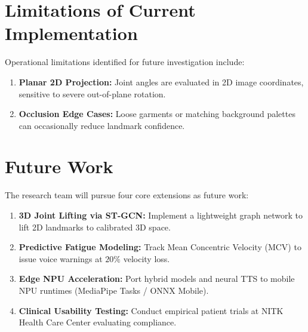 \documentclass[12pt]{report}
\begin{document}
\section{Limitations of Current Implementation}
Operational limitations identified for future investigation include:
\begin{enumerate}[label={(\alph*)}, leftmargin=*, itemsep=0pt, topsep=0.1em, parsep=0pt]
    \item \textbf{Planar 2D Projection:} Joint angles are evaluated in 2D image coordinates, sensitive to severe out-of-plane rotation.
    \item \textbf{Occlusion Edge Cases:} Loose garments or matching background palettes can occasionally reduce landmark confidence.
\end{enumerate}

\section{Future Work}
The research team will pursue four core extensions as future work:
\begin{enumerate}[label={(\arabic*)}, leftmargin=*, itemsep=0pt, topsep=0.1em, parsep=0pt]
    \item \textbf{3D Joint Lifting via ST-GCN:} Implement a lightweight graph network to lift 2D landmarks to calibrated 3D space.
    \item \textbf{Predictive Fatigue Modeling:} Track Mean Concentric Velocity (MCV) to issue voice warnings at $20\%$ velocity loss.
    \item \textbf{Edge NPU Acceleration:} Port hybrid models and neural TTS to mobile NPU runtimes (MediaPipe Tasks / ONNX Mobile).
    \item \textbf{Clinical Usability Testing:} Conduct empirical patient trials at NITK Health Care Center evaluating compliance.
\end{enumerate}
\end{document}
